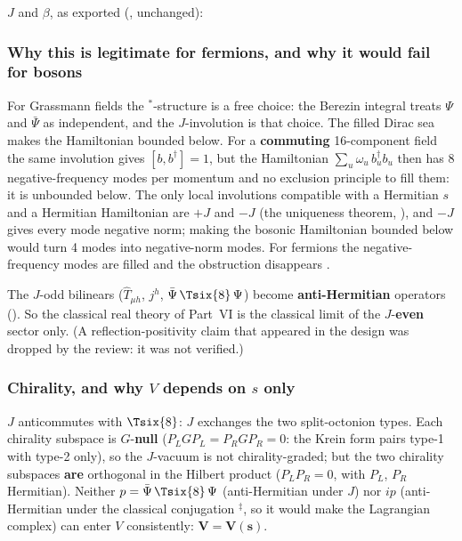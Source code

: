 $J$ and $\beta$, as exported (, unchanged):

{\small

}

\subsubsection{Why this is legitimate for fermions, and why it would fail for bosons}
\label{sec:3.5.6}

For Grassmann fields the ${}^{*}$-structure is a free choice: the Berezin integral treats $\Psi$ and
$\bar\Psi$ as independent, and the $J$-involution is that choice. The filled Dirac sea makes the
Hamiltonian bounded below. For a \textbf{commuting} 16-component field the same involution gives
$[b,b^{\dagger}]=1$, but the Hamiltonian $\sum_u\omega_u\,b_u^{\dagger}b_u$ then has 8
negative-frequency modes per momentum and no exclusion principle to fill them: it is unbounded
below. The only local involutions compatible with a Hermitian $s$ and a Hermitian Hamiltonian are
$+J$ and $-J$ (the uniqueness theorem, ), and $-J$ gives every mode negative norm;
making the bosonic Hamiltonian bounded below would turn 4 modes into negative-norm modes. For
fermions the negative-frequency modes are filled and the obstruction disappears .

The $J$-odd bilinears ($\hat T_{\mu h}$, $j^h$, $\bar\Psi\,\Tsix{8}\,\Psi$) become
\textbf{anti-Hermitian} operators (). So the classical real theory of Part~VI is the
classical limit of the $J$-\textbf{even} sector only. (A reflection-positivity claim that appeared in
the design was dropped by the review: it was not verified.)

\subsubsection{Chirality, and why \texorpdfstring{$V$}{V} depends on \texorpdfstring{$s$}{s} only}
\label{sec:3.5.7}

$J$ anticommutes with $\Tsix{8}$: $J$ exchanges the two split-octonion types. Each chirality subspace
is $G$-\textbf{null} ($P_L G P_L=P_R G P_R=0$: the Krein form pairs type-1 with type-2 only), so the
$J$-vacuum is not chirality-graded; but the two chirality subspaces \textbf{are} orthogonal in the
Hilbert product ($P_LP_R=0$, with $P_L$, $P_R$ Hermitian). Neither $p=\bar\Psi\,\Tsix{8}\,\Psi$
(anti-Hermitian under $J$) nor $ip$ (anti-Hermitian under the classical conjugation ${}^{\ddagger}$,
so it would make the Lagrangian complex) can enter $V$ consistently: $\boldsymbol{V=V(s)}$.
 

